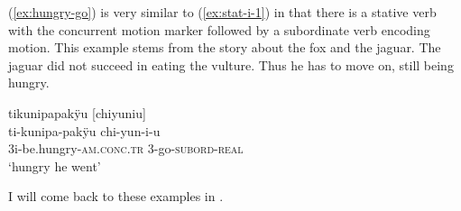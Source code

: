 (\ref{ex:hungry-go}) is very similar to (\ref{ex:stat-i-1}) in that there is a stative verb with the concurrent motion marker followed by a subordinate verb encoding motion. This example stems from the story about the fox and the jaguar. The jaguar did not succeed in eating the vulture. Thus he has to move on, still being hungry.

\ea\label{ex:hungry-go}
\begingl
\glpreamble tikunipapakÿu \textup{[}chiyuniu\textup{]}\\
\gla ti-kunipa-pakÿu chi-yun-i-u\\
\glb 3i-be.hungry-\textsc{am.conc.tr} 3-go-\textsc{subord}-\textsc{real}\\
\glft ‘hungry he went’
\endgl
\trailingcitation{[jmx-n120429ls-x5.222]}
\xe

I will come back to these examples in .

%



